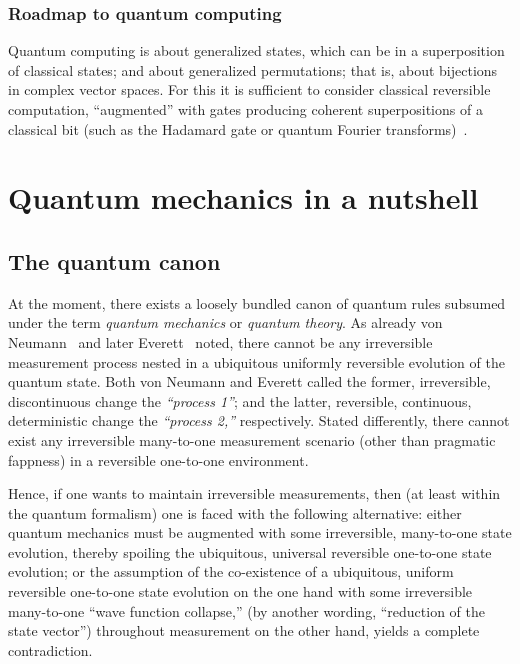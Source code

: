 \subsection{Roadmap to quantum computing}

Quantum computing is about generalized states, which can be in a superposition of classical states; and about generalized permutations;
that is, about bijections in complex vector spaces.
For this it is sufficient to consider classical reversible computation, ``augmented'' with
gates producing coherent superpositions of a classical bit  (such as the Hadamard gate
or quantum Fourier transforms)~\cite{Shi:2003:BTC:2011508.2011515,Montanaro:2016:npjqi.2015.23}.











\chapter{Quantum mechanics in a nutshell}
\label{2016-pu-book-chapter-qmian} %


\section{The quantum canon}

At the moment, there exists a loosely bundled canon of quantum rules subsumed under the term {\em quantum mechanics}
 or {\em quantum theory}.
As already von Neumann~\cite{v-neumann-49,v-neumann-55}
and later
Everett~\cite{everett,sep-qm-everett,sep-qm-manyworlds} noted,
there cannot be any irreversible measurement process
nested in a ubiquitous uniformly reversible evolution of the quantum state.
Both von Neumann and Everett called the former, irreversible, discontinuous change  the {\em ``process 1''};
and the latter, reversible, continuous, deterministic  change  the {\em ``process 2,''} respectively.
Stated differently,
there cannot exist
any irreversible many-to-one measurement scenario (other than pragmatic fappness) in a reversible one-to-one environment.

Hence, if one wants to maintain irreversible measurements, then (at least within the quantum formalism) one is faced with the following alternative:
either quantum mechanics must be augmented with some irreversible, many-to-one state evolution, thereby spoiling the ubiquitous, universal
reversible one-to-one state evolution;
or the assumption of the co-existence of a ubiquitous, uniform reversible one-to-one state evolution
on the one hand
with some irreversible many-to-one
``wave function collapse,''
(by another wording,
``reduction of the state vector'')
throughout measurement on the other hand, yields a complete contradiction.

